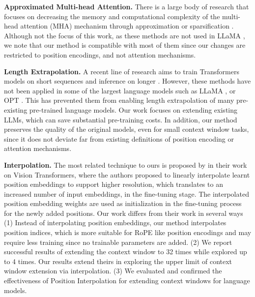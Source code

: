 \documentclass{article} %
\theoremstyle{definition}
\begin{document}
{\noindent \bf Approximated Multi-head Attention.} There is a large body of research that focuses on decreasing the memory and computational complexity of the multi-head attention (MHA) mechanism through approximation or sparsification \citep{child2019generating, zaheer2020bigbird, beltagy2020longformer, wang2020linformer, choromanski2021rethinking, kitaev2020reformer, ren2021combiner}. Although not the focus of this work, as these methods are not used in LLaMA \citep{touvron2023llama}, we note that our method is compatible with most of them since our changes are restricted to position encodings, and not attention mechanisms.

{\noindent \bf Length Extrapolation.} A recent line of research aims to train Transformers models on short sequences and inference on longer \citep{press2022train, sun2022lengthextrapolatable, haviv2022transformer}. However, these methods have not been applied in some of the largest language models such as LLaMA \citep{touvron2023llama}, or OPT \citep{zhang2022opt}.  This has prevented them from enabling length extrapolation of many pre-existing pre-trained language models. Our work focuses on extending existing LLMs, which can save substantial pre-training costs. In addition, our method preserves the quality of the original models, even for small context window tasks, since it does not deviate far from existing definitions of position encoding or attention mechanisms.

{\noindent \bf Interpolation.} The most related technique to ours is proposed by \citet{dosovitskiy2021an} in their work on Vision Transformers, where the authors proposed to linearly interpolate learnt position embeddings to support higher resolution, which translates to an increased number of input embeddings, in the fine-tuning stage. The interpolated position embedding weights are used as initialization in the fine-tuning process for the newly added positions. Our work differs from their work in several ways (1) Instead of interpolating position embeddings, our method interpolates position indices, which is more suitable for RoPE like position encodings and may require less training since no trainable parameters are added. (2) We report successful results of extending the context window to 32 times while \citet{dosovitskiy2021an} explored up to 4 times. Our results extend theirs in exploring the upper limit of context window extension via interpolation. (3) We evaluated and confirmed the effectiveness of Position Interpolation for extending context windows for language models.
\end{document}
